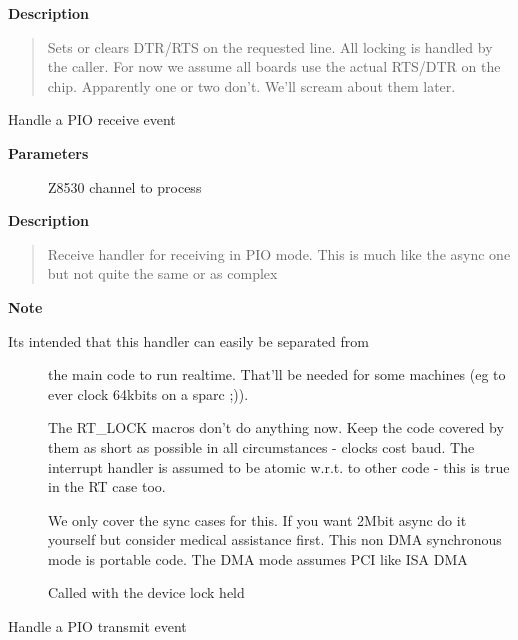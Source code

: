 \documentclass[a4paper,8pt,english]{sphinxmanual}
\begin{document}
\textbf{Description}
\begin{quote}

Sets or clears DTR/RTS on the requested line. All locking is handled
by the caller. For now we assume all boards use the actual RTS/DTR
on the chip. Apparently one or two don't. We'll scream about them
later.
\end{quote}

\begin{fulllineitems}
\label{networking/z8530book:c.z8530_rx}
Handle a PIO receive event

\end{fulllineitems}


\textbf{Parameters}
\begin{description}
\item[{}] \leavevmode
Z8530 channel to process

\end{description}

\textbf{Description}
\begin{quote}

Receive handler for receiving in PIO mode. This is much like the
async one but not quite the same or as complex
\end{quote}

\textbf{Note}
\begin{description}
\item[{Its intended that this handler can easily be separated from}] \leavevmode
the main code to run realtime. That'll be needed for some machines
(eg to ever clock 64kbits on a sparc ;)).

The RT\_LOCK macros don't do anything now. Keep the code covered
by them as short as possible in all circumstances - clocks cost
baud. The interrupt handler is assumed to be atomic w.r.t. to
other code - this is true in the RT case too.

We only cover the sync cases for this. If you want 2Mbit async
do it yourself but consider medical assistance first. This non DMA
synchronous mode is portable code. The DMA mode assumes PCI like
ISA DMA

Called with the device lock held

\end{description}

\begin{fulllineitems}
\label{networking/z8530book:c.z8530_tx}
Handle a PIO transmit event

\end{fulllineitems}
\end{document}
